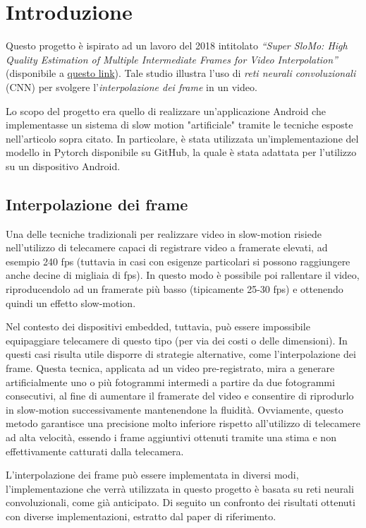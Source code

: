\chapter*{Introduzione}

Questo progetto è ispirato ad un lavoro del 2018 intitolato 
\textit{``Super SloMo: High Quality Estimation of Multiple Intermediate Frames for Video Interpolation''}
(disponibile a \href{http://jianghz.me/projects/superslomo/}{questo link}).
Tale studio illustra l'uso di \textit{reti neurali convoluzionali} (CNN) per svolgere l'\textit{interpolazione dei frame} 
in un video.

Lo scopo del progetto era quello di realizzare un'applicazione Android che implementasse un sistema di slow motion 
"artificiale" tramite le tecniche esposte nell'articolo sopra citato. In particolare, è stata utilizzata 
un'implementazione del modello in Pytorch disponibile su GitHub, la quale è stata adattata per l'utilizzo su un 
dispositivo Android.

\section*{Interpolazione dei frame}

Una delle tecniche tradizionali per realizzare video in slow-motion risiede nell'utilizzo di telecamere capaci di 
registrare video a framerate elevati, ad esempio 240 fps (tuttavia in casi con esigenze particolari si possono 
raggiungere anche decine di migliaia di fps). In questo modo è possibile poi rallentare il video, riproducendolo ad 
un framerate più basso (tipicamente 25-30 fps) e ottenendo quindi un effetto slow-motion.

Nel contesto dei dispositivi embedded, tuttavia, può essere impossibile equipaggiare telecamere di questo tipo (per via
dei costi o delle dimensioni). In questi casi risulta utile disporre di strategie alternative, come l'interpolazione dei 
frame. Questa tecnica, applicata ad un video pre-registrato, mira a generare artificialmente uno o più fotogrammi intermedi 
a partire da due fotogrammi consecutivi, al fine di aumentare il framerate del video e consentire di riprodurlo in slow-motion
successivamente mantenendone la fluidità. Ovviamente, questo metodo garantisce una precisione molto inferiore rispetto
all'utilizzo di telecamere ad alta velocità, essendo i frame aggiuntivi ottenuti tramite una stima e non effettivamente
catturati dalla telecamera.

L'interpolazione dei frame può essere implementata in diversi modi, l'implementazione che verrà utilizzata in questo progetto
è basata su reti neurali convoluzionali, come già anticipato. Di seguito un confronto dei risultati ottenuti con diverse
implementazioni, estratto dal paper di riferimento.

